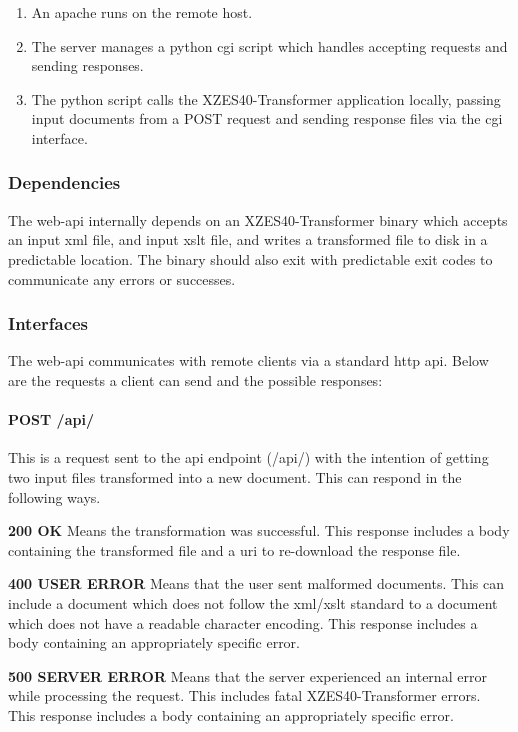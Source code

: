 \begin{enumerate}
	\item  An \gls{apache} runs on the remote host.\cite{apache-server}
    \item The server manages a \gls{python} \gls{cgi} script which handles accepting requests and sending responses.
    \item The \gls{python} script calls the XZES40-Transformer application locally, passing input documents from a POST request and sending response files via the \gls{cgi} interface.
\end{enumerate}

\subsubsection{Dependencies}

The \gls{web-api} internally depends on an XZES40-Transformer binary which accepts an input \gls{xml} file, and input \gls{xslt} file, and writes a transformed file to disk in a predictable location.
The binary should also exit with predictable exit codes to communicate any errors or successes.

\subsubsection{Interfaces}

The \gls{web-api} communicates with remote clients via a standard \gls{http} \gls{api}.
Below are the requests a client can send and the possible responses:

\paragraph{POST /api/}

This is a request sent to the \gls{api} endpoint (/api/) with the intention of getting two input files transformed into a new document.
This can respond in the following ways.

\begin{description}
	\item {
    	\textbf{200 OK}	Means the transformation was successful.
        This response includes a body containing the transformed file and a \gls{uri} to re-download the response file.
    }
    \item {
    	\textbf{400 USER ERROR} Means that the user sent malformed documents.
        This can include a document which does not follow the \gls{xml}/\gls{xslt} standard to a document which does not have a readable character encoding.
        This response includes a body containing an appropriately specific error.
    }
    \item {
    	\textbf{500 SERVER ERROR} Means that the server experienced an internal error while processing the request.
       	This includes fatal XZES40-Transformer errors.
        This response includes a body containing an appropriately specific error.
    }
\end{description}

